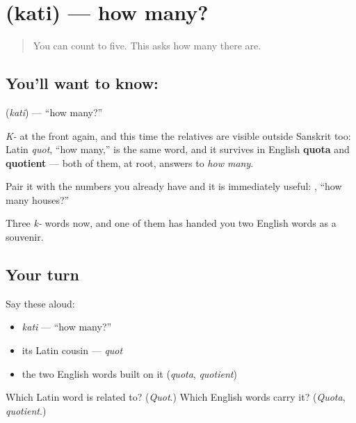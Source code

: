 \section[\texorpdfstring{\sk{कति} (kati)}{कति (kati)}]{ (kati) — how many?}

\label{lesson:SA-C18-how-many}



\begin{quote}
You can count to five. This asks how many there are.
\end{quote}

\subsection*{You'll want to know: }
\textbf{} (\emph{kati}) — \textquotedblleft{}how many?\textquotedblright{}

\emph{K-} at the front again, and this time the relatives are visible outside Sanskrit too: Latin \emph{quot}, \textquotedblleft{}how many,\textquotedblright{} is the same word, and it survives in English \textbf{quota} and \textbf{quotient} — both of them, at root, answers to \emph{how many}.

Pair it with the numbers you already have and it is immediately useful:  , \textquotedblleft{}how many houses?\textquotedblright{}

\begin{grammarlens}[title={What you've built}]
Three \emph{k-} words now, and one of them has handed you two English words as a souvenir.
\end{grammarlens}

\subsection*{Your turn}
Say these aloud:

\begin{itemize}
\raggedright
  \item \emph{kati} — \textquotedblleft{}how many?\textquotedblright{}
  \item its Latin cousin — \emph{quot}
  \item the two English words built on it (\emph{quota}, \emph{quotient})
\end{itemize}

\begin{tcolorbox}[breakable,colback=teal!4,colframe=teal!35!black,title={Before you move on}]
Which Latin word is  related to? (\emph{Quot}.) Which English words carry it? (\emph{Quota}, \emph{quotient}.)
\end{tcolorbox}
